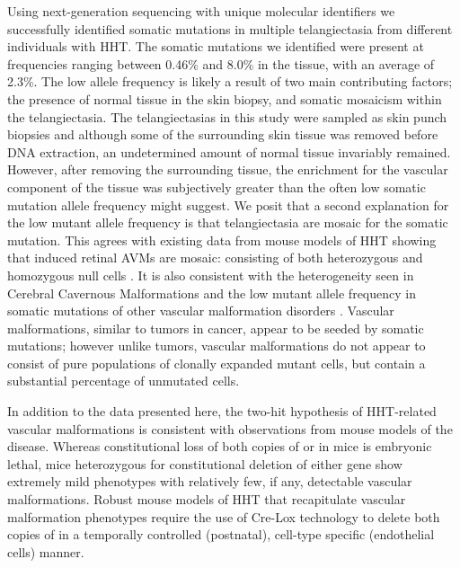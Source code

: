 Using next-generation sequencing with unique molecular identifiers we successfully identified somatic mutations in multiple telangiectasia from different individuals with HHT.  The somatic mutations we identified were present at frequencies ranging between 0.46\% and 8.0\% in the tissue, with an average of 2.3\%. The low allele frequency is likely a result of two main contributing factors; the presence of normal tissue in the skin biopsy, and somatic mosaicism within the telangiectasia. The telangiectasias in this study were sampled as skin punch biopsies and although some of the surrounding skin tissue was removed before DNA extraction, an undetermined amount of normal tissue invariably remained.  However, after removing the surrounding tissue, the enrichment for the vascular component of the tissue was subjectively greater than the often low somatic mutation allele frequency might suggest. We posit that a second explanation for the low mutant allele frequency is that telangiectasia are mosaic for the somatic mutation. This agrees with existing data from mouse models of HHT showing that induced retinal AVMs are mosaic: consisting of both heterozygous and homozygous null cells \citep{jin2017}. It is also consistent with the heterogeneity seen in Cerebral Cavernous Malformations \citep{detter2018, malinverno2019} and the low mutant allele frequency in somatic mutations of other vascular malformation disorders \citep{alolabi2018, soblet2017, limaye2015, limaye2009, shirley2013, couto2015, luks2015, nikolaev2018, couto2017, akers2009, mcdonald2014}.  Vascular malformations, similar to tumors in cancer, appear to be seeded by somatic mutations; however unlike tumors, vascular malformations do not appear to consist of pure populations of clonally expanded mutant cells, but contain a substantial percentage of unmutated cells.   	

	In addition to the data presented here, the two-hit hypothesis of HHT-related vascular malformations is consistent with observations from mouse models of the disease. Whereas constitutional loss of both copies of  or  in mice is embryonic lethal, mice heterozygous for constitutional deletion of either gene show extremely mild phenotypes with relatively few, if any, detectable vascular malformations\citep{bourdeau1999, srinivasan2003}. Robust mouse models of HHT that recapitulate vascular malformation phenotypes require the use of Cre-Lox technology to delete both copies of  in a temporally controlled (postnatal), cell-type specific (endothelial cells) manner. 
	
